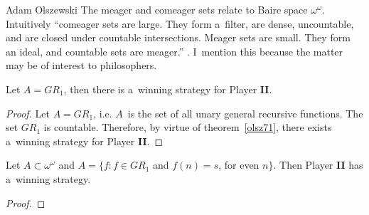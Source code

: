 \begin{artengenv}{Adam Olszewski}
The meager and comeager sets relate to Baire space $\omega^{\omega}$. Intuitively ``comeager sets are large. They form a~filter, are dense, uncountable, and are closed under countable intersections. Meager sets are small. They form an ideal, and countable sets are meager.''
\parencite[][p.212]{soare_turing_2016}. %
 I~mention this because the matter may be of interest to philosophers.
\begin{proposition}
Let $A=GR_{1}$, then there is a~winning strategy for Player \textbf{II}.
\end{proposition}
\begin{proof}
Let $A=GR_{1}$, i.e. $A$~is the set of all unary general recursive functions. The set $GR_{1}$ is countable. Therefore, by virtue of theorem~\ref{olsz71}, there exists a~winning strategy for Player \textbf{II}.
\end{proof}
%

\begin{proposition}
Let $A \subset \omega^{\omega}$ and $A = \{f: f \in GR_{1}$ and $f(n)=s$, for even $n\}$. Then Player \textbf{II} has a~winning strategy.
\end{proposition}
\begin{proof}
\end{proof}
%


\end{artengenv}
